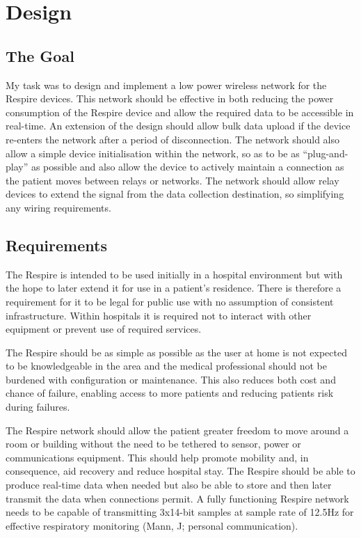 
\chapter{Design}

\section{The Goal}
My task was to design and implement a low power wireless network for the Respire devices. This
network should be effective in both reducing the power consumption of the Respire device and
allow the required data to be accessible in real-time. An extension of the design should allow bulk
data upload if the device re-enters the network after a period of disconnection. The network should
also allow a simple device initialisation within the network, so as to be as ``plug-and-play'' as possible
and also allow the device to actively maintain a connection as the patient moves between relays or
networks. The network should allow relay devices to extend the signal from the data collection
destination, so simplifying any wiring requirements.

\section{Requirements}
The Respire is intended to be used initially in a hospital environment but with the hope to later
extend it for use in a patient's residence. There is therefore a requirement for it to be legal for public
use with no assumption of consistent infrastructure. Within hospitals it is required not to interact
with other equipment or prevent use of required services.


The Respire should be as simple as possible as the user at home is not expected to be
knowledgeable in the area and the medical professional should not be burdened with configuration
or maintenance. This also reduces both cost and chance of failure, enabling access to more patients
and reducing patients risk during failures.


The Respire network should allow the patient greater freedom to move around a room or building
without the need to be tethered to sensor, power or communications equipment. This should help
promote mobility and, in consequence, aid recovery and reduce hospital stay.
The Respire should be able to produce real-time data when needed but also be able to store and
then later transmit the data when connections permit. A fully functioning Respire network needs to
be capable of transmitting 3x14-bit samples at sample rate of 12.5Hz for effective respiratory
monitoring (Mann, J; personal communication).


